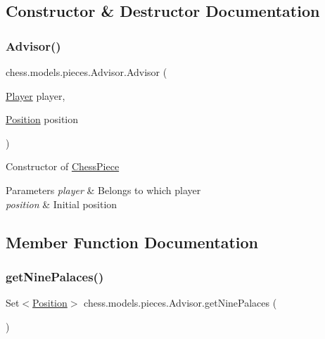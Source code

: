 \subsection{Constructor \& Destructor Documentation}
\mbox{\label{classchess_1_1models_1_1pieces_1_1_advisor_acad748f8b4188895b58996d0cef0a5d0}} 
\subsubsection{\texorpdfstring{Advisor()}{Advisor()}}
{\footnotesize\ttfamily chess.\+models.\+pieces.\+Advisor.\+Advisor (\begin{DoxyParamCaption}\item[{\mbox{\hyperlink{enumchess_1_1models_1_1enums_1_1_player}{Player}}}]{player,  }\item[{\mbox{\hyperlink{classchess_1_1models_1_1_position}{Position}}}]{position }\end{DoxyParamCaption})}

Constructor of \mbox{\hyperlink{classchess_1_1models_1_1_chess_piece}{Chess\+Piece}}


\begin{DoxyParams}{Parameters}
{\em player} & Belongs to which player \\
\hline
{\em position} & Initial position \\
\hline
\end{DoxyParams}


\subsection{Member Function Documentation}
\mbox{\label{classchess_1_1models_1_1pieces_1_1_advisor_aec70114aea45fb0b4c102a81df30f60c}} 
\subsubsection{\texorpdfstring{get\+Nine\+Palaces()}{getNinePalaces()}}
{\footnotesize\ttfamily Set$<$\mbox{\hyperlink{classchess_1_1models_1_1_position}{Position}}$>$ chess.\+models.\+pieces.\+Advisor.\+get\+Nine\+Palaces (\begin{DoxyParamCaption}{ }\end{DoxyParamCaption})}

